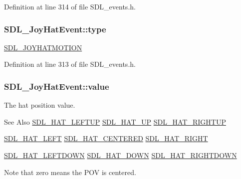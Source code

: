Definition at line 314 of file S\-D\-L\-\_\-events.\-h.

\hypertarget{struct_s_d_l___joy_hat_event_ac583dafab46c44354e210a542aff57cc}{
\subsubsection[{type}]{ S\-D\-L\-\_\-\-Joy\-Hat\-Event\-::type}}\label{struct_s_d_l___joy_hat_event_ac583dafab46c44354e210a542aff57cc}
\hyperlink{_s_d_l__events_8h_a3b589e89be6b35c02e0dd34a55f3fccaafba4080bfbad335e520097b2024f0dff}{S\-D\-L\-\_\-\-J\-O\-Y\-H\-A\-T\-M\-O\-T\-I\-O\-N} 

Definition at line 313 of file S\-D\-L\-\_\-events.\-h.

\hypertarget{struct_s_d_l___joy_hat_event_a52b179a34407449941b61d988ca72ef4}{
\subsubsection[{value}]{ S\-D\-L\-\_\-\-Joy\-Hat\-Event\-::value}}\label{struct_s_d_l___joy_hat_event_a52b179a34407449941b61d988ca72ef4}
The hat position value. \begin{DoxySeeAlso}{See Also}
\hyperlink{_s_d_l__joystick_8h_a6d7988b43c09ced08ec318a2556f1858}{S\-D\-L\-\_\-\-H\-A\-T\-\_\-\-L\-E\-F\-T\-U\-P} \hyperlink{_s_d_l__joystick_8h_ac916fe96c0740790e5496e12c67d8889}{S\-D\-L\-\_\-\-H\-A\-T\-\_\-\-U\-P} \hyperlink{_s_d_l__joystick_8h_a65fde978b4ab9c269c215d1922ae7755}{S\-D\-L\-\_\-\-H\-A\-T\-\_\-\-R\-I\-G\-H\-T\-U\-P} 

\hyperlink{_s_d_l__joystick_8h_a4666c12cae25d8bab053d8569396cd77}{S\-D\-L\-\_\-\-H\-A\-T\-\_\-\-L\-E\-F\-T} \hyperlink{_s_d_l__joystick_8h_adbfd6f0bad25cd1bb79f8c0a065f3833}{S\-D\-L\-\_\-\-H\-A\-T\-\_\-\-C\-E\-N\-T\-E\-R\-E\-D} \hyperlink{_s_d_l__joystick_8h_a5d1844afaf2ceaf58c689a8bd480a543}{S\-D\-L\-\_\-\-H\-A\-T\-\_\-\-R\-I\-G\-H\-T} 

\hyperlink{_s_d_l__joystick_8h_a3fa8609d382a0f74507890491033c784}{S\-D\-L\-\_\-\-H\-A\-T\-\_\-\-L\-E\-F\-T\-D\-O\-W\-N} \hyperlink{_s_d_l__joystick_8h_aa87f7a91d6bae8b420b133559d983338}{S\-D\-L\-\_\-\-H\-A\-T\-\_\-\-D\-O\-W\-N} \hyperlink{_s_d_l__joystick_8h_abf50339da11ca12699ee2199607d275f}{S\-D\-L\-\_\-\-H\-A\-T\-\_\-\-R\-I\-G\-H\-T\-D\-O\-W\-N}
\end{DoxySeeAlso}
Note that zero means the P\-O\-V is centered. 

